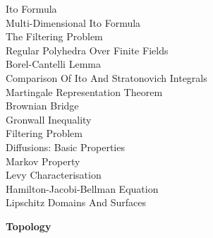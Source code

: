 Ito Formula \\
Multi-Dimensional Ito Formula \\
The Filtering Problem \\
Regular Polyhedra Over Finite Fields \\
Borel-Cantelli Lemma \\
Comparison Of Ito And Stratonovich Integrals \\
Martingale Representation Theorem \\
Brownian Bridge \\
Gronwall Inequality \\
Filtering Problem \\
Diffusions: Basic Properties \\
Markov Property \\
Levy Characterisation \\
Hamilton-Jacobi-Bellman Equation \\
Lipschitz Domains And Surfaces

\newpage

\textbf{Topology}

